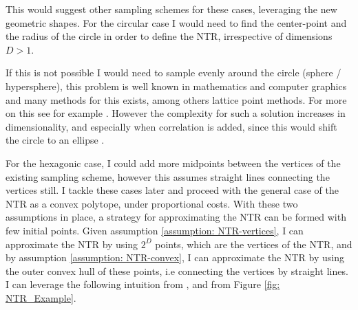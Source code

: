 \documentclass[11pt]{article}
\begin{document}
This would suggest other sampling schemes for these cases, leveraging the new geometric shapes.
For the circular case I would need to find the center-point and the radius of the circle in order to define the \ac{NTR}, irrespective of dimensions $D>1$.

If this is not possible I would need to sample evenly around the circle (sphere / hypersphere), this problem is well known in mathematics and computer graphics and many methods for this exists,
among others lattice point methods. For more on this see for example \autocite{delbono2024}. 
However the complexity for such a solution increases in dimensionality, and especially when correlation is added,
since this would shift the circle to an ellipse \autocite{Dybvig2020}.

For the hexagonic case, I could add more midpoints between the vertices of the existing sampling scheme, however this assumes straight lines connecting the vertices still.
I tackle these cases later and proceed with the general case of the \ac{NTR} as a convex polytope, under proportional costs.
With these two assumptions in place, a strategy for approximating the \ac{NTR} can be formed with few initial points.
Given assumption \ref{assumption: NTR-vertices}, I can approximate the \ac{NTR} by using $2^{D}$ points, which are the vertices of the \ac{NTR},
and by assumption \ref{assumption: NTR-convex}, I can approximate the \ac{NTR} by using the outer convex hull of these points, i.e connecting the vertices by straight lines.
I can leverage the following intuition from \autocite{Scheidegger2023}, and from Figure \ref{fig: NTR_Example}.
\end{document}
